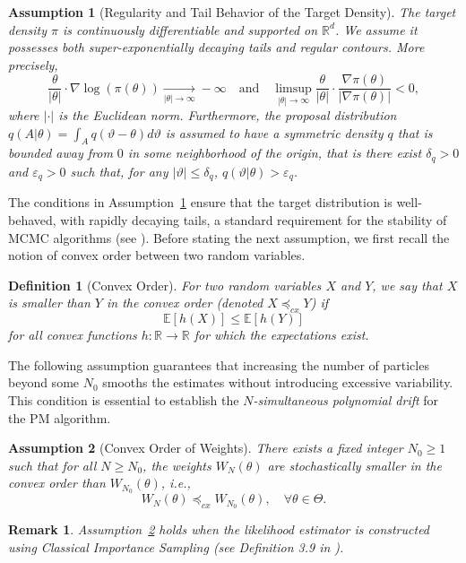 \documentclass[pdflatex,sn-mathphys-num]{sn-jnl}
\newcommand{\reals}{\mathbb{R}}
\newcommand{\E}{\mathbb{E}}
\renewcommand{\geq}{\geqslant}
\renewcommand{\leq}{\leqslant}
\theoremstyle{thmstyleone}
\theoremstyle{thmstyletwo}
\newtheorem{remark}{Remark}
\theoremstyle{thmstylethree}
\newtheorem{definition}{Definition}
\newtheorem{hypothesis}{Assumption}
\begin{document}
\begin{hypothesis}[Regularity and Tail Behavior of the Target Density]
The target density $\pi$ is continuously differentiable and supported on $\reals^d$. We assume it possesses both super-exponentially decaying tails and regular contours. More precisely,
$$
\frac{\theta}{|\theta|} \cdot \nabla\log(\pi(\theta)) \underset{|\theta| \rightarrow \infty}{\longrightarrow} -\infty \quad \text{and} \quad \underset{|\theta| \rightarrow \infty}{\limsup} \frac{\theta}{|\theta|} \cdot \frac{\nabla\pi(\theta)}{|\nabla\pi(\theta)|} < 0,
$$
where $|\cdot|$ is the Euclidean norm.
Furthermore, the proposal distribution $q(A|\theta) = \int_A q(\vartheta-\theta) d\vartheta$ is assumed to have a symmetric density $q$ that is bounded away from $0$ in some neighborhood of the origin, that is there exist $ \delta_q>0$ and $\varepsilon_q>0$ such that, for any $|\vartheta| \leq  \delta_q$, $q(\vartheta| \theta)> \varepsilon_q$.
\label{hyp1}
\end{hypothesis}
The conditions in Assumption~\ref{hyp1} ensure that the target distribution is well-behaved, with rapidly decaying tails, a standard requirement for the stability of MCMC algorithms (see \cite{jarner_geometric_2000}). 
Before stating the next assumption, we first recall the notion of convex order between two random variables.

\begin{definition}[Convex Order]  
For two random variables $X$ and $Y$, we say that $X$ is smaller than $Y$ in the convex order (denoted $X \preceq_{cx} Y$) if
$$
\E[h(X)] \leq \E[h(Y)]
$$
for all convex functions $h : \reals \rightarrow \reals$ for which the expectations exist.
\label{def1}
\end{definition}

The following assumption guarantees that increasing the number of particles beyond some $N_0$ smooths the estimates without introducing excessive variability. This condition is essential to establish the \textit{$N$-simultaneous polynomial drift} for the PM algorithm.

\begin{hypothesis}[Convex Order of Weights]
There exists a fixed integer $N_0 \geq 1$ such that for all $N \geq N_0$, the weights $W_N(\theta)$ are stochastically smaller in the convex order than $W_{N_0}(\theta)$, i.e.,
$$W_N(\theta)\preceq_{cx} W_{N_0}(\theta), \quad \forall \theta \in \Theta.$$
\label{hyp2}
\end{hypothesis}
\begin{remark}
Assumption~\ref{hyp2} holds when the likelihood estimator is constructed using Classical Importance Sampling (see Definition 3.9 in \cite{robert_monte_2004}).
\end{remark}
\end{document}

